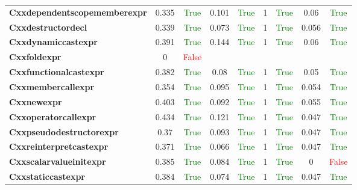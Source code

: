 \documentclass{article}
\begin{document}
\begin{xltabular}{\textwidth}{lcccccccc}
\textbf{{\fontsize{10}{12}\selectfont Cxxdependentscopememberexpr}}& 0.335&\textcolor{green}{True}& 0.101&\textcolor{green}{True}& 1&\textcolor{green}{True}& 0.06&\textcolor{green}{True} \\[0.5ex]
\textbf{{\fontsize{10}{12}\selectfont Cxxdestructordecl}}& 0.339&\textcolor{green}{True}& 0.073&\textcolor{green}{True}& 1&\textcolor{green}{True}& 0.056&\textcolor{green}{True} \\[0.5ex]
\textbf{{\fontsize{10}{12}\selectfont Cxxdynamiccastexpr}}& 0.391&\textcolor{green}{True}& 0.144&\textcolor{green}{True}& 1&\textcolor{green}{True}& 0.06&\textcolor{green}{True} \\[0.5ex]
\textbf{{\fontsize{10}{12}\selectfont Cxxfoldexpr}}& 0&\textcolor{red}{False} \\[0.5ex]
\textbf{{\fontsize{10}{12}\selectfont Cxxfunctionalcastexpr}}& 0.382&\textcolor{green}{True}& 0.08&\textcolor{green}{True}& 1&\textcolor{green}{True}& 0.05&\textcolor{green}{True} \\[0.5ex]
\textbf{{\fontsize{10}{12}\selectfont Cxxmembercallexpr}}& 0.354&\textcolor{green}{True}& 0.095&\textcolor{green}{True}& 1&\textcolor{green}{True}& 0.054&\textcolor{green}{True} \\[0.5ex]
\textbf{{\fontsize{10}{12}\selectfont Cxxnewexpr}}& 0.403&\textcolor{green}{True}& 0.092&\textcolor{green}{True}& 1&\textcolor{green}{True}& 0.055&\textcolor{green}{True} \\[0.5ex]
\textbf{{\fontsize{10}{12}\selectfont Cxxoperatorcallexpr}}& 0.434&\textcolor{green}{True}& 0.121&\textcolor{green}{True}& 1&\textcolor{green}{True}& 0.047&\textcolor{green}{True} \\[0.5ex]
\textbf{{\fontsize{10}{12}\selectfont Cxxpseudodestructorexpr}}& 0.37&\textcolor{green}{True}& 0.093&\textcolor{green}{True}& 1&\textcolor{green}{True}& 0.047&\textcolor{green}{True} \\[0.5ex]
\textbf{{\fontsize{10}{12}\selectfont Cxxreinterpretcastexpr}}& 0.371&\textcolor{green}{True}& 0.066&\textcolor{green}{True}& 1&\textcolor{green}{True}& 0.047&\textcolor{green}{True} \\[0.5ex]
\textbf{{\fontsize{10}{12}\selectfont Cxxscalarvalueinitexpr}}& 0.385&\textcolor{green}{True}& 0.084&\textcolor{green}{True}& 1&\textcolor{green}{True}& 0&\textcolor{red}{False} \\[0.5ex]
\textbf{{\fontsize{10}{12}\selectfont Cxxstaticcastexpr}}& 0.384&\textcolor{green}{True}& 0.074&\textcolor{green}{True}& 1&\textcolor{green}{True}& 0.047&\textcolor{green}{True} \\[0.5ex]

\end{xltabular}
\end{document}
